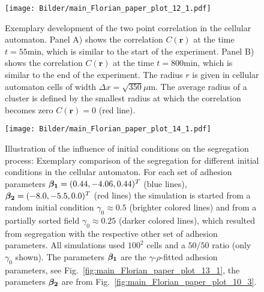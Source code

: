 \documentclass[10pt,letterpaper]{article}
\newcommand{\figref}[1]{Fig.~\ref{fig:#1}}
\begin{document}
\begin{figure}[ht!]
 \centering
 \texttt{[image: Bilder/main\_Florian\_paper\_plot\_12\_1.pdf]}
 \caption{Exemplary development of the two point correlation in the cellular
  automaton. Panel A) shows the correlation $C(\textbf{r})$ at the time $t=55$min, which
  is similar to the start of the experiment. Panel B) shows the correlation
  $C(\textbf{r})$ at the time $t=800$min, which is similar to the end of the experiment.
  The radius $r$ is given in cellular automaton cells of width
  $\Delta x=\sqrt{350}\mu \text{m}$. The average radius of a cluster is defined
  by the smallest radius at which the correlation becomes zero $C(\textbf{r})=0$
  (red line).}
 \label{fig:main_Florian_paper_plot_12_1}
\end{figure}

\begin{figure}[ht!]
 \centering
 \texttt{[image: Bilder/main\_Florian\_paper\_plot\_14\_1.pdf]}
 \caption{Illustration of the influence of initial conditions on the
   segregation process: Exemplary comparison of the segregation for
   different initial conditions in the cellular automaton. For each
   set of adhesion parameters $\text{\boldmath$\beta_1$} = (0.44,
   -4.06, 0.44)^T$ (blue lines), $\text{\boldmath$\beta_2$} =
   (-8.0,-5.5,0.0)^T$ (red lines) the simulation is started from a
   random initial condition $\gamma_0 \approx 0.5$ (brighter colored
   lines) and from a partially sorted field $\gamma_0 \approx 0.25$
   (darker colored lines), which resulted from segregation with the
   respective other set of adhesion parameters. All simulations used
   $100^2$ cells and a $50/50$ ratio (only $\gamma_0$
   shown). The parameters $\text{\boldmath$\beta_1$}$ are the
   $\gamma$-$\rho$-fitted adhesion parameters, see
   \figref{main_Florian_paper_plot_13_1}, the parameters
   $\text{\boldmath$\beta_2$}$ are from
   \figref{main_Florian_paper_plot_10_3}.}
 \label{fig:main_Florian_paper_plot_14_1}
\end{figure}
\end{document}
